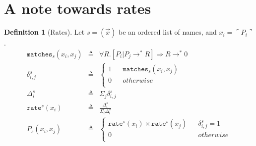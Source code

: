 \documentclass[]{amsart}
\newcommand{\lpquote}{\ulcorner}
\newcommand{\rpquote}{\urcorner}
\newcommand{\id}[1]{\texttt{#1}}
\newcommand{\juxtap}{\mathbin{\id{|}}}
\newcommand{\quotep}[1]{\lpquote #1 \rpquote}
\newcommand{\red}{\rightarrow}
\newcommand{\parop}{\;|\;}		%
\newcommand{\wbbisim}{\stackrel{\centerdot}{\approx}} %
\newcommand{\wbeq}{\approx}	%
\newtheorem{lem}[thm]{Lemma}
\theoremstyle{definition}
\newtheorem{defn}[thm]{Definition}
\theoremstyle{remark}
\numberwithin{equation}{subsection}
\begin{document}



\section{A note towards rates}

\begin{defn}[Rates]
	Let $s = (\vec{x})$ be an ordered list of names, and $x_i = \quotep{P_i}$.
	\begin{eqnarray*}
		\id{matches}_s( x_i, x_j)
		& \triangleq & 
		{ \forall R . [ P_{i} \juxtap P_{j} \red^* R ] \Rightarrow R \red^* 0 } \\
		\delta^s_{i,j} 
		& \triangleq & 
		\left\{ 
			\begin{array}{ccc} 
				1 & & \id{matches}_s(x_i,x_j) \\
	           	0 & & otherwise \\
			\end{array}
		\right. \\
        \Delta^s_i & \triangleq & \Sigma_{j} \delta^s_{i,j} \\
		\id{rate}^s(x_i) 
		& \triangleq & 
		\frac{\Delta^s_i}{\Sigma_i \Delta^s_i} \\
		P_s(x_i,x_j) 
		& \triangleq &
		\left\{ 
			\begin{array}{ccc} 
				\id{rate}^s(x_i) \times \id{rate}^s(x_j) & & \delta^s_{i,j} = 1 \\
	           	0 & & otherwise \\
			\end{array}
		\right. \\
	\end{eqnarray*}
\end{defn}
\end{document}
